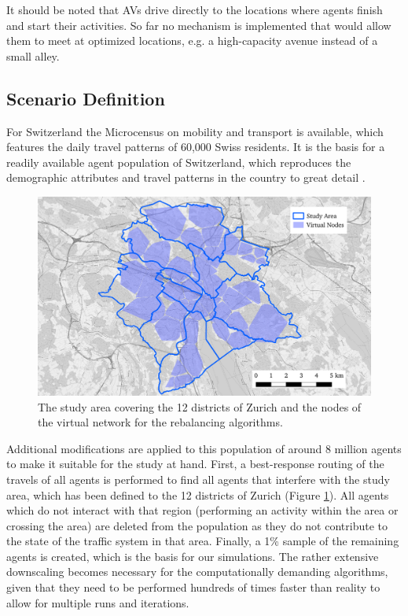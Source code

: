 It should be noted that AVs drive directly to the locations where agents finish and
start their activities. So far no mechanism is implemented that would allow them
to meet at optimized locations, e.g. a high-capacity avenue instead of a small
alley.

\subsection{Scenario Definition}

For Switzerland the Microcensus on mobility and transport \cite{microcensus} is
available, which features the daily travel patterns of 60,000 Swiss residents.
It is the basis for a readily available agent population of
Switzerland, which reproduces the demographic attributes and travel patterns
in the country to great detail \cite{ivtbaseline}.

\begin{figure}[h]
\begin{center}\includegraphics[width=1.0\textwidth]{figures/map.pdf}\end{center}
\caption{The study area covering the 12 districts of Zurich and the nodes of the
virtual network for the rebalancing algorithms.}
\label{fig:study_area_vnodes}
\end{figure}

Additional modifications are applied to this population of around 8 million
agents to make it suitable for the study at hand. First, a best-response routing
of the travels of all agents is performed to find all agents that interfere
with the study area, which has been defined to the 12 districts of Zurich (Figure \ref{fig:study_area_vnodes}).
All agents which do not interact with that region (performing an activity within
the area or crossing the area) are deleted from the population as they do
not contribute to the state of the traffic system in that area. Finally, a 1\%
sample of the remaining agents is created, which is the basis for our
simulations. The rather extensive downscaling becomes necessary for the computationally
demanding algorithms, given that they need to be performed hundreds of times faster
than reality to allow for multiple runs and iterations.

